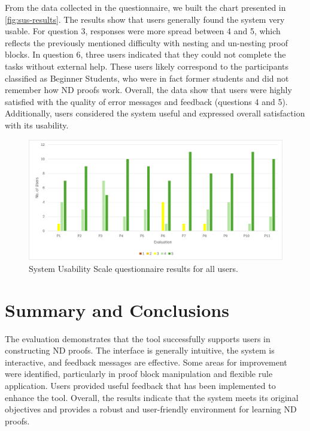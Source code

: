 From the data collected in the questionnaire, we built the chart presented in \autoref{fig:sus-results}. The results show that users generally found the system very usable. For question 3, responses were more spread between 4 and 5, which reflects the previously mentioned difficulty with nesting and un-nesting proof blocks. In question 6, three users indicated that they could not complete the tasks without external help. These users likely correspond to the participants classified as Beginner Students, who were in fact former students and did not remember how \gls{ND} proofs work. Overall, the data show that users were highly satisfied with the quality of error messages and feedback (questions 4 and 5). Additionally, users considered the system useful and expressed overall satisfaction with its usability.  

\begin{figure}[h]
    \centering
    \includegraphics[width=0.95\linewidth]{Chapters/Figures/sus-chart.png}
    \caption{System Usability Scale questionnaire results for all users.}
    \label{fig:sus-results}
\end{figure}

\section{Summary and Conclusions}

The evaluation demonstrates that the tool successfully supports users in constructing \gls{ND} proofs. The interface is generally intuitive, the system is interactive, and feedback messages are effective. Some areas for improvement were identified, particularly in proof block manipulation and flexible rule application. Users provided useful feedback that has been implemented to enhance the tool. Overall, the results indicate that the system meets its original objectives and provides a robust and user-friendly environment for learning \gls{ND} proofs.